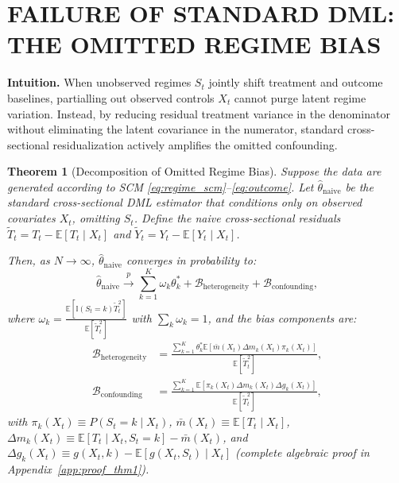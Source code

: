 \documentclass[twoside]{article}
\newtheorem{theorem}{Theorem}
\theoremstyle{definition}
\newcommand{\E}{\mathbb{E}}
\newcommand{\one}{\mathbb{I}}
\begin{document}
\section{FAILURE OF STANDARD DML: THE OMITTED REGIME BIAS}
\label{sec:bias}

\textbf{Intuition.} When unobserved regimes $S_t$ jointly shift treatment and outcome baselines, partialling out observed controls $X_t$ cannot purge latent regime variation. Instead, by reducing residual treatment variance in the denominator without eliminating the latent covariance in the numerator, standard cross-sectional residualization actively amplifies the omitted confounding.

\begin{theorem}[Decomposition of Omitted Regime Bias]
\label{thm:bias}
Suppose the data are generated according to SCM \eqref{eq:regime_scm}--\eqref{eq:outcome}. Let $\hat{\theta}_{\mathrm{naive}}$ be the standard cross-sectional DML estimator \citep{chernozhukov2018double} that conditions only on observed covariates $X_t$, omitting $S_t$. Define the naive cross-sectional residuals $\tilde{T}_t = T_t - \E[T_t \mid X_t]$ and $\tilde{Y}_t = Y_t - \E[Y_t \mid X_t]$. 

Then, as $N \to \infty$, $\hat{\theta}_{\mathrm{naive}}$ converges in probability to:
\begin{equation}
    \hat{\theta}_{\mathrm{naive}} \xrightarrow{p} \sum_{k=1}^K \omega_k \theta_k^* + \mathcal{B}_{\mathrm{heterogeneity}} + \mathcal{B}_{\mathrm{confounding}},
\end{equation}
where $\omega_k = \frac{\E[\one(S_t = k) \tilde{T}_t^2]}{\E[\tilde{T}_t^2]}$ with $\sum_k \omega_k = 1$, and the bias components are:
\begin{align}
    \mathcal{B}_{\mathrm{heterogeneity}} &= \frac{\sum_{k=1}^K \theta_k^* \E\left[ \bar{m}(X_t) \Delta m_k(X_t) \pi_k(X_t) \right]}{\E[\tilde{T}_t^2]}, \label{eq:b_het} \\
    \mathcal{B}_{\mathrm{confounding}} &= \frac{\sum_{k=1}^K \E\left[ \pi_k(X_t) \Delta m_k(X_t) \Delta g_k(X_t) \right]}{\E[\tilde{T}_t^2]}, \label{eq:b_conf}
\end{align}
with $\pi_k(X_t) \equiv P(S_t = k \mid X_t)$, $\bar{m}(X_t) \equiv \E[T_t \mid X_t]$, $\Delta m_k(X_t) \equiv \E[T_t \mid X_t, S_t = k] - \bar{m}(X_t)$, and $\Delta g_k(X_t) \equiv g(X_t, k) - \E[g(X_t, S_t) \mid X_t]$ (complete algebraic proof in Appendix~\ref{app:proof_thm1}).
\end{theorem}
\end{document}
